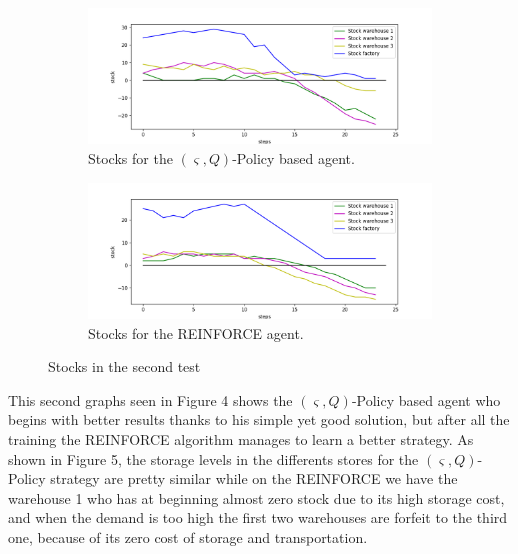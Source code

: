 \documentclass[journal, a4paper]{IEEEtran}
\theoremstyle{plain}
\theoremstyle{definition}
\begin{document}
\begin{figure}
	\centering
	\begin{subfigure}[b]{0.5\textwidth}
		\includegraphics[width=\columnwidth]{reinforce_stocks.png}
		\caption{Stocks for the $(\varsigma, Q)$-Policy based agent.}
		\label{reinforce_stocks}
	\end{subfigure}
	\newline
	\begin{subfigure}[b]{0.5\textwidth}
		\includegraphics[width=\columnwidth]{s_q_stocks.png}
		\caption{ Stocks for the REINFORCE agent.}
		\label{s_q_stocks}
	\end{subfigure}
	\caption{Stocks in the second test}\label{fig:animals}
	 \vspace{-20pt}
\end{figure}
This second graphs seen in Figure 4 shows the $(\varsigma, Q)$-Policy based agent who begins with better results thanks to his simple yet good solution, but after all the training the REINFORCE algorithm manages to learn a better strategy. As shown in Figure 5, the storage levels in the differents stores for the $(\varsigma, Q)$-Policy strategy are pretty similar while on the REINFORCE we have the warehouse 1 who has at beginning almost zero stock due to its high storage cost, and when the demand is too high the first two warehouses are forfeit to the third one, because of its zero cost of storage and transportation. \newline
\end{document}
